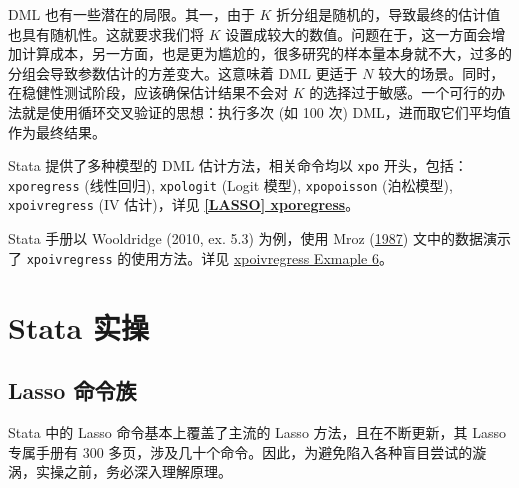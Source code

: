 {DML 也有一些潜在的局限。其一，由于 $K$ 折分组是随机的，导致最终的估计值也具有随机性。这就要求我们将 $K$ 设置成较大的数值。问题在于，这一方面会增加计算成本，另一方面，也是更为尴尬的，很多研究的样本量本身就不大，过多的分组会导致参数估计的方差变大。这意味着 DML 更适于 $N$ 较大的场景。同时，在稳健性测试阶段，应该确保估计结果不会对 $K$ 的选择过于敏感。一个可行的办法就是使用循环交叉验证的思想：执行多次 (如 100 次) DML，进而取它们平均值作为最终结果。


Stata 提供了多种模型的 DML 估计方法，相关命令均以 \texttt{xpo} 开头，包括：\texttt{xporegress} (线性回归), \texttt{xpologit} (Logit 模型), \texttt{xpopoisson} (泊松模型), \texttt{xpoivregress} (IV 估计)，详见 \href{https://www.stata.com/manuals/lassoxporegress.pdf}{\bfseries{[\MakeUppercase{lasso}] xporegress}}。

Stata 手册以 Wooldridge (2010, ex. 5.3) 为例，使用 Mroz (\href{http://sci-hub.ren/10.2307/1911029}{1987}) 文中的数据演示了 \texttt{xpoivregress} 的使用方法。详见 
\href{https://www.stata.com/manuals/lassoinferenceexamples.pdf#lassoInferenceexamplesRemarksandexamples6Fittinganinferentialmodelwithendogenouscovariates}{xpoivregress Exmaple 6}。





















\section{Stata 实操}

\subsection{Lasso 命令族}
Stata 中的 Lasso 命令基本上覆盖了主流的 Lasso 方法，且在不断更新，其 Lasso 专属手册有 300 多页，涉及几十个命令。因此，为避免陷入各种盲目尝试的漩涡，实操之前，务必深入理解原理。

}
